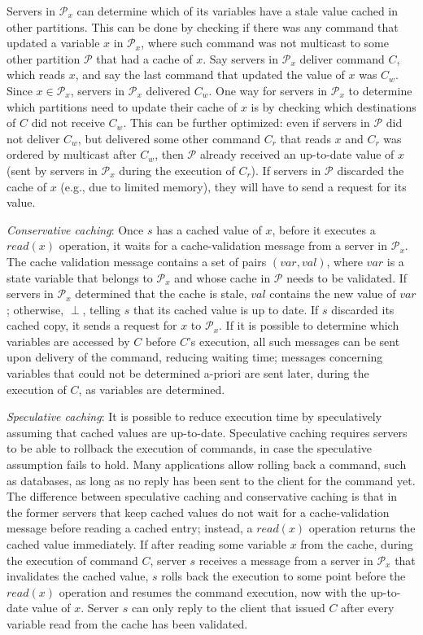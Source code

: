 \documentclass[11pt]{article}
\newcommand{\ppm}{\mathcal{P}}
\begin{document}
Servers in $\ppm_x$ can determine which of its variables have a stale value cached in other partitions. This can be done by checking if there was any command that updated a variable $x$ in $\ppm_x$, where such command was not multicast to some other partition $\ppm$ that had a cache of $x$. Say servers in $\ppm_x$ deliver command $C$, which reads $x$, and say the last command that updated the value of $x$ was $C_w$. Since $x \in \ppm_x$, servers in $\ppm_x$ delivered $C_w$. One way for servers in $\ppm_x$ to determine which partitions need to update their cache of $x$ is by checking which destinations of $C$ did not receive $C_w$. This can be further optimized: even if servers in $\ppm$ did not deliver $C_w$, but delivered some other command $C_r$ that reads $x$ and $C_r$ was ordered by multicast after $C_w$, then $\ppm$ already received an up-to-date value of $x$ (sent by servers in $\ppm_x$ during the execution of $C_r$). If servers in $\ppm$ discarded the cache of $x$ (e.g., due to limited memory), they will have to send a request for its value.


\emph{Conservative caching}: Once $s$ has a cached value of $x$, before it executes a $read(x)$ operation, it waits for a cache-validation message from a server in $\ppm_x$. The cache validation message contains a set of pairs $(var, val)$, where $var$ is a state variable that belongs to $\ppm_x$ and whose cache in $\ppm$ needs to be validated.
If servers in $\ppm_x$ determined that the cache is stale, $val$ contains the new value of $var$; otherwise, $\perp$, telling $s$ that its cached value is up to date.
If $s$ discarded its cached copy, it sends a request for $x$ to $\ppm_x$.
If it is possible to determine which variables are accessed by $C$ before $C$'s execution, all such messages can be sent upon delivery of the command, reducing waiting time; messages concerning variables that could not be determined a-priori are sent later, during the execution of $C$, as variables are determined.

\emph{Speculative caching}: It is possible to reduce execution time by speculatively assuming that cached values are up-to-date.
Speculative caching requires servers to be able to rollback the execution of commands, in case the speculative assumption fails to hold.
Many applications allow rolling back a command, such as databases, as long as no reply has been sent to the client for the command yet.
The difference between speculative caching and conservative caching is that in the former servers that keep cached values do not wait for a cache-validation message before reading a cached entry; instead, a $read(x)$ operation returns the cached value immediately.
If after reading some variable $x$ from the cache, during the execution of command $C$, server $s$ receives a message from a server in $\ppm_x$ that invalidates the cached value, $s$ rolls back the execution to some point before the $read(x)$ operation and resumes the command execution, now with the up-to-date value of $x$.
Server $s$ can only reply to the client that issued $C$ after every variable read from the cache has been validated.
\end{document}

